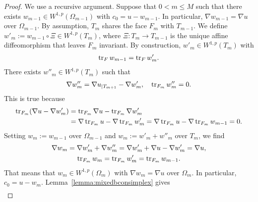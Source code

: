 \documentclass[10pt,letterpaper]{article}
\begin{document}
\begin{proof}
    We use a recursive argument.
    Suppose that $0 < m \leq M$ such that there exists $w_{m-1} \in W^{1,p}(\Omega_{m-1})$ with $c_{0} = u - w_{m-1}$.
    In particular, $\nabla w_{m-1} = \nabla u$ over $\Omega_{m-1}$. 
    By assumption, $T_{m}$ shares the face $F_{m}$ with $T_{m-1}$. 
    We define $w'_{m} := w_{m-1} \circ \Xi \in W^{1,p}(T_{m})$,
    where $\Xi : T_{m} \rightarrow T_{m-1}$ is the unique affine diffeomorphism that leaves $F_{m}$ invariant. 
    By construction, $w'_{m} \in W^{1,p}(T_{m})$ with 
    \begin{align*}
        \operatorname{tr}_F w_{m-1} = \operatorname{tr}_F w'_{m}
        .
    \end{align*}
    There exists $w''_{m} \in W^{1,p}(T_{m})$ such that 
    \begin{align*}
        \nabla w''_{m} = \nabla u_{|T_{m+1}} - \nabla w'_{m}, 
        \quad 
        \operatorname{tr}_{F_{m}} w''_{m} = 0.
    \end{align*}
    This is true because 
    \begin{align*}
        \operatorname{tr}_{F_{m}}( \nabla u - \nabla w'_{m} ) 
        &= 
        \operatorname{tr}_{F_{m}} \nabla u - \operatorname{tr}_{F_{m}} \nabla w'_{m}
        \\&= 
        \nabla \operatorname{tr}_{F_{m}} u - \nabla \operatorname{tr}_{F_{m}} w'_{m}
        = 
        \nabla \operatorname{tr}_{F_{m}} u - \nabla \operatorname{tr}_{F_{m}} w_{m-1}
        = 
        0
        .
    \end{align*}
    Setting $w_{m} := w_{m-1}$ over $\Omega_{m-1}$ and $w_{m} := w'_{m} + w''_{m}$ over $T_{m}$, 
    we find 
    \begin{gather*}
        \nabla w_{m} = \nabla w'_{m} + \nabla w''_{m} = \nabla w'_{m} + \nabla u - \nabla w'_{m} = \nabla u,
        \\
        \operatorname{tr}_{F_{m}} w_{m} = \operatorname{tr}_{F_{m}} w'_{m} = \operatorname{tr}_{F_{m}} w_{m-1}.
    \end{gather*}
    That means that $w_{m} \in W^{1,p}(\Omega_{m})$ with $\nabla w_{m} = \nabla u$ over $\Omega_{m}$. 
    In particular, $c_{0} = u - w_{m}$. 
    Lemma~\ref{lemma:mixedbconsimplex} gives 
    \begin{align*}

\end{align*}
\end{proof}
\end{document}
